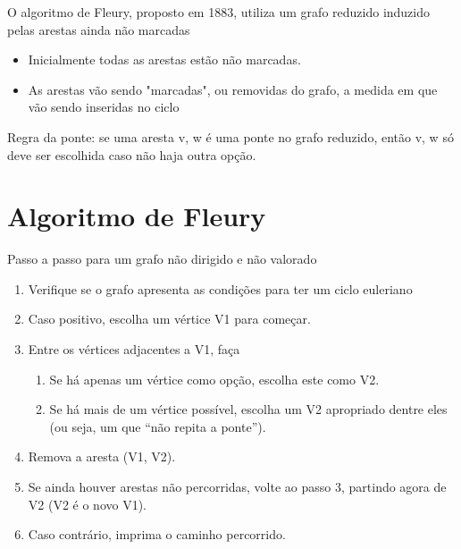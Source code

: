 O algoritmo de Fleury, proposto em 1883, utiliza um grafo reduzido induzido pelas arestas ainda não marcadas

\begin{itemize}
	\item Inicialmente todas as arestas estão não marcadas.
	\item As arestas vão sendo "marcadas", ou removidas do grafo, a medida em que vão sendo inseridas no ciclo
\end{itemize}

Regra da ponte: se uma aresta {v, w} é uma ponte no grafo reduzido, então {v, w} só deve ser escolhida caso não haja outra opção.

\section{Algoritmo de Fleury}

Passo a passo para um grafo não dirigido e não valorado

\begin{enumerate}
	\item Verifique se o grafo apresenta as condições para ter um ciclo euleriano
	\item Caso positivo, escolha um vértice V1 para começar.
	\item Entre os vértices adjacentes a V1, faça
	      \begin{enumerate}
		      \item Se há apenas um vértice como opção, escolha este como V2.
		      \item Se há mais de um vértice possível, escolha um V2 apropriado dentre eles (ou seja, um que “não repita a ponte”).
	      \end{enumerate}
	\item Remova a aresta (V1, V2).
	\item Se ainda houver arestas não percorridas, volte ao passo 3, partindo agora de V2 (V2 é o novo V1).
	\item Caso contrário, imprima o caminho percorrido.
\end{enumerate}



